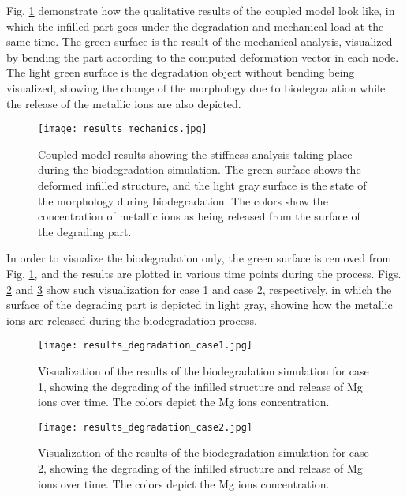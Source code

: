 Fig. \ref{fig:infill_results_mechanics} demonstrate how the qualitative results of the coupled model look like, in which the infilled part goes under the degradation and mechanical load at the same time. The green surface is the result of the mechanical analysis, visualized by bending the part according to the computed deformation vector in each node. The light green surface is the degradation object without bending being visualized, showing the change of the morphology due to biodegradation while the release of the metallic ions are also depicted.


\begin{figure}[h]
\centering
\medskip
\texttt{[image: results\_mechanics.jpg]}
\caption[Coupled model results showing the stiffness analysis taking place during biodegradation simulation]{Coupled model results showing the stiffness analysis taking place during the biodegradation simulation. The green surface shows the deformed infilled structure, and the light gray surface is the state of the morphology during biodegradation. The colors show the concentration of metallic ions as being released from the surface of the degrading part.} \label{fig:infill_results_mechanics}
\end{figure}

In order to visualize the biodegradation only, the green surface is removed from Fig. \ref{fig:infill_results_mechanics}, and the results are plotted in various time points during the process. Figs. \ref{fig:infill_results_degradation_case1} and \ref{fig:infill_results_degradation_case2} show such visualization for case 1 and case 2, respectively, in which the surface of the degrading part is depicted in light gray, showing how the metallic ions are released during the biodegradation process. 

\begin{figure}[h]
\centering
\medskip
\texttt{[image: results\_degradation\_case1.jpg]}
\caption[Visualization of the results of the biodegradation simulation for case 1]{Visualization of the results of the biodegradation simulation for case 1, showing the degrading of the infilled structure and release of Mg ions over time. The colors depict the Mg ions concentration.} \label{fig:infill_results_degradation_case1}
\end{figure}


\begin{figure}[h]
\centering
\medskip
\texttt{[image: results\_degradation\_case2.jpg]}
\caption[Visualization of the results of the biodegradation simulation for case 2]{Visualization of the results of the biodegradation simulation for case 2, showing the degrading of the infilled structure and release of Mg ions over time. The colors depict the Mg ions concentration.} \label{fig:infill_results_degradation_case2}
\end{figure}

